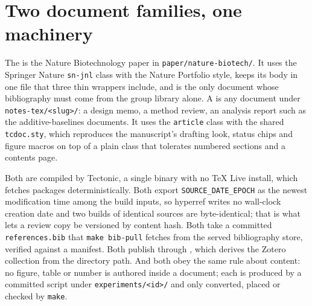 
\section{Two document families, one machinery}
\label{sec:families}

The  is the Nature Biotechnology paper in
\texttt{paper/nature-biotech/}. It uses the Springer Nature \texttt{sn-jnl} class
with the Nature Portfolio style, keeps its body in one file that three thin
wrappers include, and is the only document whose bibliography must come from the
group library alone. A  is any document under
\texttt{notes-tex/<slug>/}: a design memo, a method review, an analysis report such
as the additive-baselines documents. It uses the \texttt{article} class with the
shared \texttt{tcdoc.sty}, which reproduces the manuscript's drafting look, status
chips and figure macros on top of a plain class that tolerates numbered sections
and a contents page.

Both are compiled by Tectonic, a single binary with no TeX Live install, which
fetches packages deterministically. Both export \texttt{SOURCE\_DATE\_EPOCH} as the
newest modification time among the build inputs, so hyperref writes no wall-clock
creation date and two builds of identical sources are byte-identical; that is what
lets a review copy be versioned by content hash. Both take a committed
\texttt{references.bib} that \texttt{make bib-pull} fetches from the served
bibliography store, verified against a manifest. Both publish through
, which derives the Zotero collection from
the directory path. And both obey the same rule about content: no figure, table or
number is authored inside a document; each is produced by a committed script under
\texttt{experiments/<id>/} and only converted, placed or checked by \texttt{make}.


